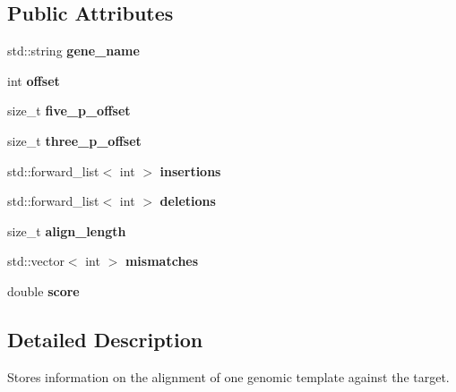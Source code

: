 \subsection*{Public Attributes}
\begin{DoxyCompactItemize}
\item 
\mbox{\label{structAlignment__data_aa59d88faf0d6ec3b4a908bd4ab426c7f}} 
std\+::string {\bfseries gene\+\_\+name}
\item 
\mbox{\label{structAlignment__data_a88d8eefe00cdb8fa340c993985d6a3e8}} 
int {\bfseries offset}
\item 
\mbox{\label{structAlignment__data_a83c2902e3291a3b3a1ab2e5e81ec7fcd}} 
size\+\_\+t {\bfseries five\+\_\+p\+\_\+offset}
\item 
\mbox{\label{structAlignment__data_a31daa27cb20395e18f29f5b53c5e6674}} 
size\+\_\+t {\bfseries three\+\_\+p\+\_\+offset}
\item 
\mbox{\label{structAlignment__data_af5725b4491f8d133d3cb20b9f4943a24}} 
std\+::forward\+\_\+list$<$ int $>$ {\bfseries insertions}
\item 
\mbox{\label{structAlignment__data_a233ad0e1783442eb7fa6fc53ccbd3a48}} 
std\+::forward\+\_\+list$<$ int $>$ {\bfseries deletions}
\item 
\mbox{\label{structAlignment__data_ac1d83cdc20d8cc4110ec747645f608a4}} 
size\+\_\+t {\bfseries align\+\_\+length}
\item 
\mbox{\label{structAlignment__data_a647fbf5ecc1e4a370a78f972602cf503}} 
std\+::vector$<$ int $>$ {\bfseries mismatches}
\item 
\mbox{\label{structAlignment__data_add1c4a0888f58070afb4b17e6a160e70}} 
double {\bfseries score}
\end{DoxyCompactItemize}


\subsection{Detailed Description}
Stores information on the alignment of one genomic template against the target. 

